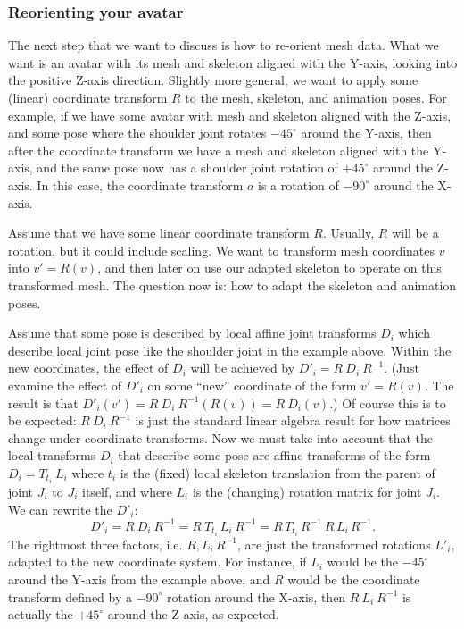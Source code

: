 \subsubsection{Reorienting your avatar}
The next step that we want to discuss is how to re-orient mesh data. What we want is an avatar
with its mesh and skeleton aligned with the Y-axis, looking into the positive Z-axis direction.
Slightly more general, we want to apply some (linear) coordinate transform $R$ to the mesh, skeleton,
and animation poses. For example, if we have some avatar with mesh and skeleton aligned with the Z-axis,
and some pose where the shoulder joint rotates $-45^\circ$ around the Y-axis,
then after the coordinate transform we have a mesh and skeleton aligned with the Y-axis, and the same
pose now has a shoulder joint rotation of $+45^\circ$ around the Z-axis.
In this case, the coordinate transform $a$ is a rotation of $-90^\circ$ around the X-axis.

Assume that we have some linear coordinate transform $R$. Usually, $R$ will be a rotation, but it
could include scaling.
We want to transform mesh coordinates $v$ into $v' =R(v)$, and then later on use our adapted skeleton
to operate on this transformed mesh.
The question now is: how to adapt the skeleton and animation poses.

Assume that some pose is described by local affine joint transforms $D_i$ which
describe local joint pose like the shoulder joint in the example above.
Within the new coordinates, the effect of $D_i$ will be achieved
by $D'_i = R\:D_i\:R^{-1}$.
(Just examine the effect of $D'_i$ on some ``new'' coordinate of the form $v' = R(v)$. The result is that
$D'_i(v') = R\:D_i\:R^{-1} (R(v)) = R\:D_i(v)$.)
Of course this is to be expected: $R\:D_i\:R^{-1}$ is just the standard linear algebra result
for how matrices change under coordinate transforms.
Now we must take into account that the local transforms $D_i$ that describe some pose
are affine transforms of the form $D_i = T_{t_i}\:L_i$ where $t_i$ is the (fixed) local skeleton translation
from the parent of joint $J_i$ to $J_i$ itself, and where $L_i$ is the (changing) rotation matrix for joint $J_i$.
We can rewrite the  $D'_i$:
\begin{equation}
D'_i = R\:D_i\:R^{-1} = R\:T_{t_i}\,L_i\:R^{-1}
=R\,T_{t_i}\,R^{-1}\:R\,L_i\,R^{-1}.
\end{equation}
The rightmost three factors, i.e. $R,L_i\,R^{-1}$, are just the transformed rotations $L'_i$, adapted to
the new coordinate system. For instance, if $L_i$ would be the $-45^\circ$ around the Y-axis from the example
above, and $R$ would be the coordinate transform defined by a $-90^\circ$ rotation around the X-axis,
then $R\:L_i\:R^{-1}$ is actually the $+45^\circ$ around the Z-axis, as expected.

